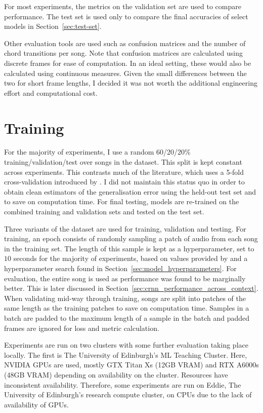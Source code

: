 For most experiments, the metrics on the validation set are used to compare performance. The test set is used only to compare the final accuracies of select models in Section~\ref{sec:test-set}.

Other evaluation tools are used such as confusion matrices and the number of chord transitions per song. Note that confusion matrices are calculated using discrete frames for ease of computation. In an ideal setting, these would also be calculated using continuous measures. Given the small differences between the two for short frame lengths, I decided it was not worth the additional engineering effort and computational cost.

\section{Training}\label{sec:training}

For the majority of experiments, I use a random 60/20/20\% training/validation/test over songs in the dataset. This split is kept constant across experiments. This contrasts much of the literature, which uses a 5-fold cross-validation introduced by \citet{FourTimelyInsights}. I did not maintain this status quo in order to obtain clean estimators of the generalisation error using the held-out test set and to save on computation time. For final testing, models are re-trained on the combined training and validation sets and tested on the test set.

Three variants of the dataset are used for training, validation and testing. For training, an epoch consists of randomly sampling a patch of audio from each song in the training set. The length of this sample is kept as a hyperparameter, set to $10$ seconds for the majority of experiments, based on values provided by \citet{StructuredTraining} and a hyperparameter search found in Section~\ref{sec:model_hyperparameters}. For evaluation, the entire song is used as performance was found to be marginally better. This is later discussed in Section~\ref{sec:crnn_performance_across_context}. When validating mid-way through training, songs are split into patches of the same length as the training patches to save on computation time. Samples in a batch are padded to the maximum length of a sample in the batch and padded frames are ignored for loss and metric calculation.

Experiments are run on two clusters with some further evaluation taking place locally. The first is The University of Edinburgh's ML Teaching Cluster. Here, NVIDIA GPUs are used, mostly GTX Titan Xs (12GB VRAM) and RTX A6000s (48GB VRAM) depending on availability on the cluster. Resources have inconsistent availability. Therefore, some experiments are run on Eddie, The University of Edinburgh's research compute cluster, on CPUs due to the lack of availability of GPUs.

